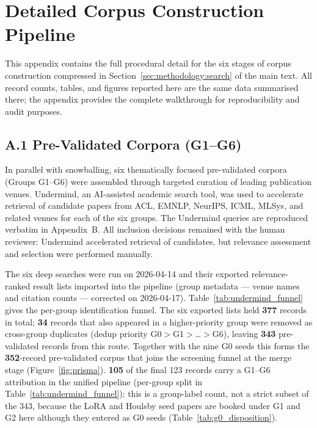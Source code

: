 
\section[\appendixname~\thesection]{Detailed Corpus Construction Pipeline}
\label{sec:appendix:corpus_pipeline}

This appendix contains the full procedural detail for the six stages of
corpus construction compressed in Section~\ref{sec:methodology:search} of the
main text. All record counts, tables, and figures reported here are the same
data summarised there; the appendix provides the complete walkthrough for
reproducibility and audit purposes.

\subsection*{A.1 Pre-Validated Corpora (G1--G6)}

In parallel with snowballing, six thematically focused pre-validated corpora
(Groups G1--G6) were assembled through targeted curation of leading
publication venues. Undermind, an AI-assisted academic search tool, was used
to accelerate retrieval of candidate papers from ACL, EMNLP, NeurIPS, ICML,
MLSys, and related venues for each of the six groups. The Undermind queries
are reproduced verbatim in Appendix~B. All inclusion decisions remained with
the human reviewer: Undermind accelerated retrieval of candidates, but
relevance assessment and selection were performed manually.

The six deep searches were run on 2026-04-14 and their exported
relevance-ranked result lists imported into the pipeline (group metadata ---
venue names and citation counts --- corrected on 2026-04-17). Table~\ref{tab:undermind_funnel}
gives the per-group identification funnel. The six exported lists held
\textbf{377} records in total; \textbf{34} records that also appeared in a
higher-priority group were removed as cross-group duplicates (dedup priority
G0${}>{}$G1${}>{}$\ldots${}>{}$G6), leaving \textbf{343} pre-validated records
from this route. Together with the nine G0 seeds this forms the
\textbf{352}-record pre-validated corpus that joins the screening funnel at
the merge stage (Figure~\ref{fig:prisma}). \textbf{105} of the final 123
records carry a G1--G6 attribution in the unified pipeline (per-group split in
Table~\ref{tab:undermind_funnel}); this is a group-label count, not a strict
subset of the 343, because the LoRA and Houlsby seed papers are booked under
G1 and G2 here although they entered as G0 seeds
(Table~\ref{tab:g0_disposition}).

